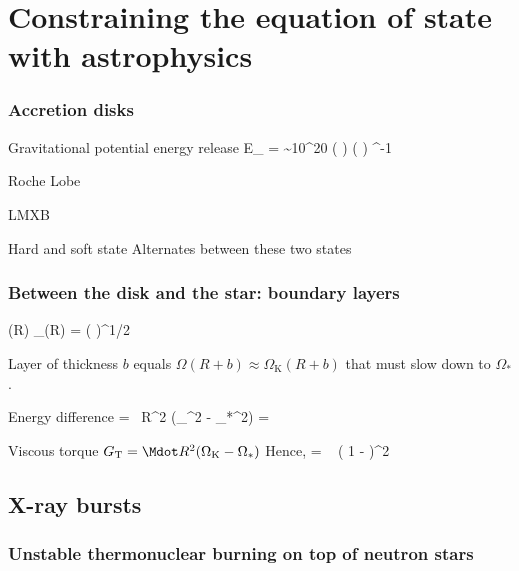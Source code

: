 \chapter{Constraining the equation of state with astrophysics}

\subsection{Accretion disks}

Gravitational potential energy release
\be
\Delta E_{} =  \sim 10^{20}  \left(  \right) \left(  \right) \unitspace\erg\unitspace\g^{-1}
\ee

Roche Lobe \cite{PRP02} \cite{LL15}

LMXB \cite{TH06}

Hard and soft state \cite{HvdK89}
Alternates between these two states \cite{MDF14} \cite{DGK07}



\subsection{Between the disk and the star: boundary layers}

\be
\Omega(R) \approx \Omega_{}(R) = \left(  \right)^{1/2}
\ee

Layer of thickness $b$ equals $\Omega(R + b) \approx \Omega_{\mathrm{K}}(R + b)$ that must slow down to $\Omega_{*}$.

Energy difference
\be
{} =  \Mdot R^2 (\Omega_{}^2 - \Omega_{*}^2) = 
 \Mdot {}  
\ee

Viscous torque $G_{\mathrm{T}} = \Mdot R^2 (\Omega_{\mathrm{K}} - \Omega_*)$
Hence,
\be
{} =   \left( 1 -  \right)^2
\ee


\section{X-ray bursts}
\subsection{Unstable thermonuclear burning on top of neutron stars}

